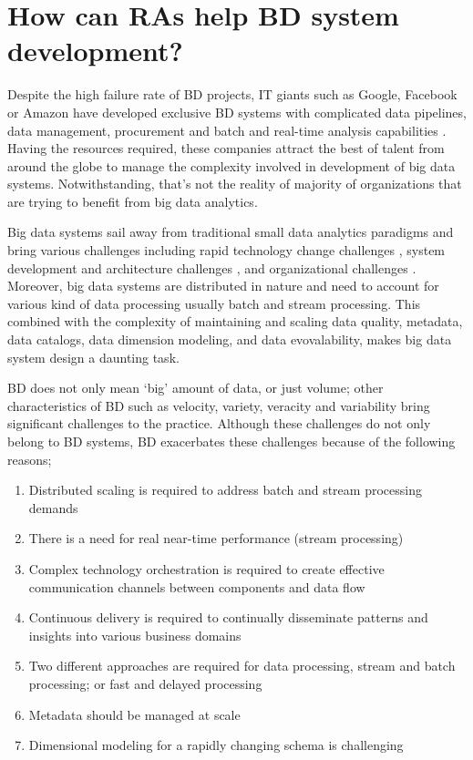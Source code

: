 \documentclass{ieeeaccess}
\begin{document}
\section{How can RAs help BD system development? }

Despite the high failure rate of BD projects, IT giants such as Google, Facebook or Amazon have developed exclusive BD systems with complicated data pipelines, data management, procurement and batch and real-time analysis capabilities \cite{kohler2019towards}. Having the resources required, these companies attract the best of talent from around the globe to manage the complexity involved in development of big data systems. Notwithstanding, that’s not the reality of majority of organizations that are trying to benefit from big data analytics. 

Big data systems sail away from traditional small data analytics paradigms and bring various challenges including rapid technology change challenges \cite{chen2017big}, system development and architecture challenges \cite{jagadish2014big}, and organizational challenges \cite{AtaeiHype}. Moreover, big data systems are distributed in nature and need to account for various kind of data processing usually batch and stream processing. This combined with the complexity of maintaining and scaling data quality, metadata, data catalogs, data dimension modeling, and data evovalability, makes big data system design a daunting task. 

BD does not only mean ‘big’ amount of data, or just volume; other characteristics of BD such as velocity, variety, veracity and variability bring significant challenges to the practice. Although these challenges do not only belong to BD systems, BD exacerbates these challenges because of the following reasons;

\begin{enumerate}
    \item Distributed scaling is required to address batch and stream processing demands
    \item There is a need for real near-time performance (stream processing) 
    \item Complex technology orchestration is required to create effective communication channels between components and data flow
    \item Continuous delivery is required to continually disseminate patterns and insights into various business domains
    \item Two different approaches are required for data processing, stream and batch processing; or fast and delayed processing 
    \item Metadata should be managed at scale 
    \item Dimensional modeling for a rapidly changing schema is challenging 
\end{enumerate}
\end{document}

